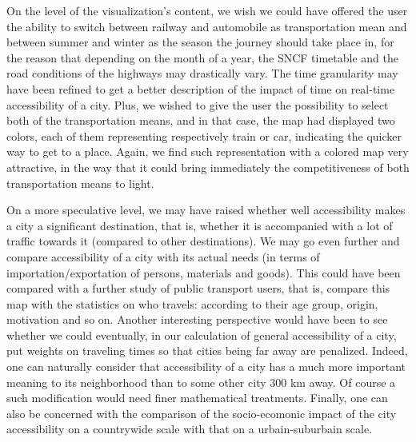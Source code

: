 \documentclass{vgtc}                          %
\begin{document}
On the level of the visualization's content, we wish we could have offered the user the ability to switch between railway and automobile as transportation mean and between summer and winter as the season the journey should take place in, for the reason that depending on the month of a year, the SNCF timetable and the road conditions of the highways may drastically vary. The time granularity may have been refined to get a better description of the impact of time on real-time accessibility of a city. Plus, we wished to give the user the possibility to select both of the transportation means, and in that case, the map had displayed two colors, each of them representing respectively train or car, indicating the quicker way to get to a place. Again, we find such representation with a colored map very attractive, in the way that
it could bring immediately the competitiveness of both transportation means to light.

 
 On a more speculative level, we may have raised whether well accessibility makes a city a significant destination, that is, whether it is accompanied with a lot of traffic towards it (compared to other destinations). We may go even further and compare accessibility of a city with its actual needs (in terms of importation/exportation of persons, materials and goods). This could have been compared with a further study of public transport users, that is, compare this map with the statistics on who travels: according to their age group, origin, motivation and so on. Another interesting perspective would have been to see whether we could eventually, in our calculation of general accessibility of a city, put weights on traveling times so that cities being far away are penalized. Indeed, one can naturally consider that accessibility of a city has a much more important meaning to its neighborhood than to some other city 300 km away. Of course a such modification would need finer mathematical treatments. Finally, one can also be concerned with the comparison of the socio-ecomonic impact of the city accessibility on a countrywide scale with that on a urbain-suburbain scale.




%

%
%
%


\end{document}
